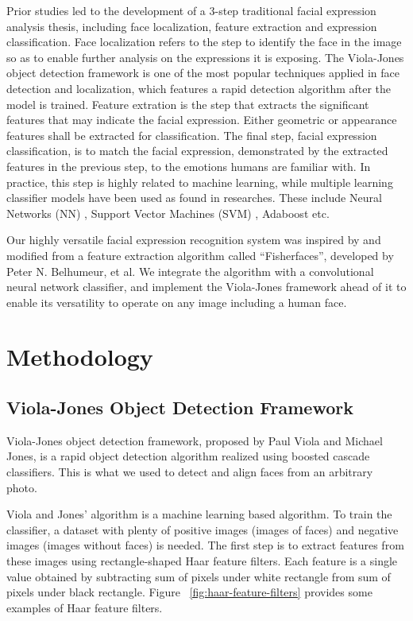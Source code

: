 \documentclass[10pt,twocolumn,letterpaper]{article}
\begin{document}
Prior studies led to the development of a 3-step traditional facial expression analysis thesis, including face localization, feature extraction and expression classification. \cite{Article01} Face localization refers to the step to identify the face in the image so as to enable further analysis on the expressions it is exposing. The Viola-Jones object detection framework is one of the most popular techniques applied in face detection and localization, which features a rapid detection algorithm after the model is trained. \cite{Article02} Feature extration is the step that extracts the significant features that may indicate the facial expression. Either geometric or appearance features shall be extracted for classification. The final step, facial expression classification, is to match the facial expression, demonstrated by the extracted features in the previous step, to the emotions humans are familiar with. In practice, this step is highly related to machine learning, while multiple learning classifier models have been used as found in researches. These include Neural Networks (NN) \cite{Article04}, Support Vector Machines (SVM) \cite{Article05}, Adaboost etc. 

Our highly versatile facial expression recognition system was inspired by and modified from a feature extraction algorithm called ``Fisherfaces'', developed by Peter N. Belhumeur, et al.\cite{Article06} We integrate the algorithm with a convolutional neural network classifier, and implement the Viola-Jones framework \cite{Article02} ahead of it to enable its versatility to operate on any image including a human face. 

\section{Methodology}

\subsection{Viola-Jones Object Detection Framework}
Viola-Jones object detection framework, proposed by Paul Viola and Michael Jones, is a rapid object detection algorithm realized using boosted cascade classifiers. \cite{Article02} This is what we used to detect and align faces from an arbitrary photo.

Viola and Jones' algorithm is a machine learning based algorithm. To train the classifier, a dataset with plenty of positive images (images of faces) and negative images (images without faces) is needed. The first step is to extract features from these images using rectangle-shaped Haar feature filters. Each feature is a single value obtained by subtracting sum of pixels under white rectangle from sum of pixels under black rectangle. Figure ~\ref{fig:haar-feature-filters} provides some examples of Haar feature filters.
\end{document}
